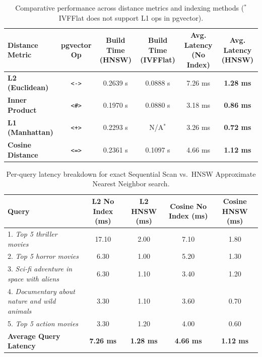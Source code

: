 \documentclass[11pt,a4paper]{article}
\begin{document}
\begin{table}[h!]
\centering
\small
\renewcommand{\arraystretch}{1.15}
\begin{tabularx}{\textwidth}{lccccc}
\toprule
\textbf{Distance Metric} & \textbf{pgvector Op} & \textbf{Build Time (HNSW)} & \textbf{Build Time (IVFFlat)} & \textbf{Avg. Latency (No Index)} & \textbf{Avg. Latency (HNSW)} \\
\midrule
\textbf{L2 (Euclidean)}     & \texttt{<->} & 0.2639 s & 0.0888 s & 7.26 ms & \textbf{1.28 ms} \\
\textbf{Inner Product}      & \texttt{<\#>} & 0.1970 s & 0.0880 s & 3.18 ms & \textbf{0.86 ms} \\
\textbf{L1 (Manhattan)}     & \texttt{<+>} & 0.2293 s & N/A$^*$ & 3.26 ms & \textbf{0.72 ms} \\
\textbf{Cosine Distance}    & \texttt{<=>} & 0.2361 s & 0.1097 s & 4.66 ms & \textbf{1.12 ms} \\
\bottomrule
\end{tabularx}
\caption{Comparative performance across distance metrics and indexing methods ($^*$IVFFlat does not support L1 ops in pgvector).}
\label{tab:benchmarks}
\end{table}

\begin{table}[h!]
\centering
\small
\renewcommand{\arraystretch}{1.15}
\begin{tabularx}{\textwidth}{lcccc}
\toprule
\textbf{Query} & \textbf{L2 No Index (ms)} & \textbf{L2 HNSW (ms)} & \textbf{Cosine No Index (ms)} & \textbf{Cosine HNSW (ms)} \\
\midrule
1. \textit{Top 5 thriller movies}                      & 17.10 & 2.00 & 7.10 & 1.80 \\
2. \textit{Top 5 horror movies}                        & 6.30  & 1.00 & 5.20 & 1.30 \\
3. \textit{Sci-fi adventure in space with aliens}      & 6.30  & 1.10 & 3.40 & 1.20 \\
4. \textit{Documentary about nature and wild animals}  & 3.30  & 1.10 & 3.60 & 0.70 \\
5. \textit{Top 5 action movies}                        & 3.30  & 1.20 & 4.00 & 0.60 \\
\midrule
\textbf{Average Query Latency}                         & \textbf{7.26 ms} & \textbf{1.28 ms} & \textbf{4.66 ms} & \textbf{1.12 ms} \\
\bottomrule
\end{tabularx}
\caption{Per-query latency breakdown for exact Sequential Scan vs.\ HNSW Approximate Nearest Neighbor search.}
\label{tab:query_latencies}
\end{table}
\end{document}
